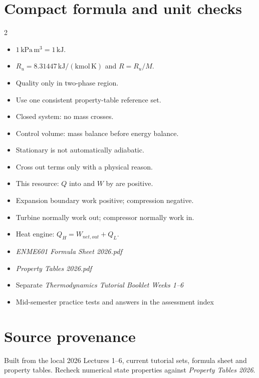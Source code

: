 \documentclass[9pt,a4paper]{extarticle}
\newcommand{\unit}[1]{\,\mathrm{#1}}
\begin{document}
\section{Compact formula and unit checks}
\begin{multicols}{2}
\begin{quick}
\begin{itemize}
\item $1\unit{kPa\,m^3}=1\unit{kJ}$.
\item $R_u=8.31447\unit{kJ/(kmol\,K)}$ and $R=R_u/M$.
\item Quality only in two-phase region.
\item Use one consistent property-table reference set.
\end{itemize}
\end{quick}
\begin{quick}
\begin{itemize}
\item Closed system: no mass crosses.
\item Control volume: mass balance before energy balance.
\item Stationary is not automatically adiabatic.
\item Cross out terms only with a physical reason.
\end{itemize}
\end{quick}
\begin{quick}
\begin{itemize}
\item This resource: $Q$ into and $W$ by are positive.
\item Expansion boundary work positive; compression negative.
\item Turbine normally work out; compressor normally work in.
\item Heat engine: $Q_H=W_{net,out}+Q_L$.
\end{itemize}
\end{quick}
\begin{quick}
\begin{itemize}
\item \textit{ENME601 Formula Sheet 2026.pdf}
\item \textit{Property Tables 2026.pdf}
\item Separate \textit{Thermodynamics Tutorial Booklet Weeks 1--6}
\item Mid-semester practice tests and answers in the assessment index
\end{itemize}
\end{quick}
\end{multicols}

\section{Source provenance}
Built from the local 2026 Lectures 1--6, current tutorial sets, formula sheet and property tables. Recheck numerical state properties against \textit{Property Tables 2026}.
\end{document}
